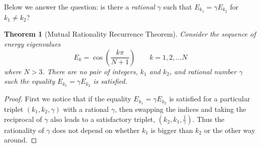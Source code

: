 \documentclass[a4paper, 10pt]{article}
\theoremstyle{plain}
\newtheorem*{theorem*}{Theorem}
\begin{document}
Below we answer the question: is there a {\emph{rational}} $\gamma$ such that
$E_{k_{1}} = \gamma E_{k_{2}}$ for $k_{1} \ne k_{2}$?

\begin{theorem*}[Mutual Rationality Recurrence Theorem]
    Consider the sequence of energy eigenvalues
    \begin{equation*}
        E_{k} = \cos{\!\left ( \frac{k \pi}{N+1} \right )}
        \qquad k=1, 2, \dots N
    \end{equation*}
    where $N >3$. There are no pair of integers, $k_{1}$ and $k_{2}$, and
    rational number $\gamma$ such the equality $E_{k_{1}} = \gamma E_{k_{2}}$ is
    satisfied.
\end{theorem*}
\begin{proof}
    First we notice that if the equality $E_{k_{1}} = \gamma E_{k_{2}}$ is
    satisfied for a particular triplet $(k_{1}, k_{2}, \gamma)$ with a rational
    $\gamma$, then swapping the indices and taking the reciprocal of $\gamma$
    also leads to a satisfactory triplet, $(k_{2}, k_{1}, \frac{1}{\gamma})$.
    Thus the rationality of $\gamma$ does not depend on whether $k_{1}$ is
    bigger than $k_{2}$ or the other way around.


\end{proof}
\end{document}
